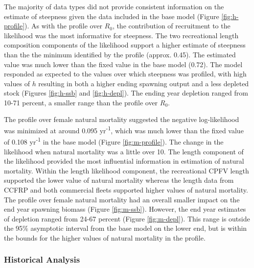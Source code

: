\documentclass[11pt,
  letterpaper,
]{article}
\begin{document}
The majority of data types did not provide consistent information on the estimate of steepness given the data included in the base model (Figure \ref{fig:h-profile}). As with the profile over \(R_0\), the contribution of recruitment to the likelihood was the most informative for steepness. The two recreational length composition components of the likelihood support a higher estimate of steepness than the the minimum identified by the profile (approx. 0.45). The estimated value was much lower than the fixed value in the base model (0.72). The model responded as expected to the values over which steepness was profiled, with high values of \(h\) resulting in both a higher ending spawning output and a less depleted stock (Figures \ref{fig:h-ssb} and \ref{fig:h-depl}). The ending year depletion ranged from 10-71 percent, a smaller range than the profile over \(R_0\).

The profile over female natural mortality suggested the negative log-likelihood was minimized at around 0.095 yr\textsuperscript{-1}, which was much lower than the fixed value of 0.108 yr\textsuperscript{-1} in the base model (Figure \ref{fig:m-profile}). The change in the likelihood when natural mortality was a little over 10. The length component of the likelihood provided the most influential information in estimation of natural mortality. Within the length likelihood component, the recreational CPFV length supported the lower value of natural mortality whereas the length data from CCFRP and both commercial fleets supported higher values of natural mortality. The profile over female natural mortality had an overall smaller impact on the end year spawning biomass (Figure \ref{fig:m-ssb}). However, the end year estimates of depletion ranged from 24-67 percent (Figure \ref{fig:m-depl}). This range is outside the 95\% asymptotic interval from the base model on the lower end, but is within the bounds for the higher values of natural mortality in the profile.

\subsubsection{Historical Analysis}\label{historical-analysis}
\end{document}
